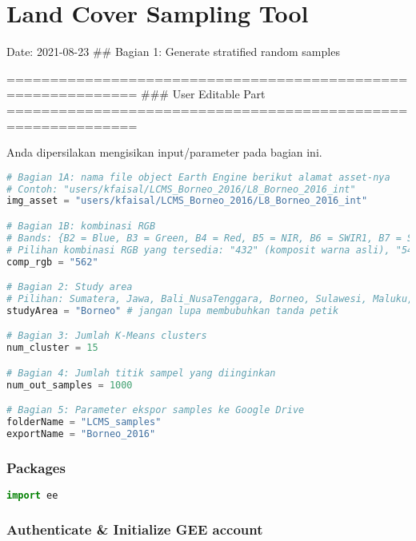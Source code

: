 \hypertarget{land-cover-sampling-tool}{%
\section{Land Cover Sampling Tool}\label{land-cover-sampling-tool}}

Date: 2021-08-23 \#\# Bagian 1: Generate stratified random samples

============================================================= \#\#\#
User Editable Part
=============================================================

Anda dipersilakan mengisikan input/parameter pada bagian ini.

\begin{lstlisting}[language=Python]
# Bagian 1A: nama file object Earth Engine berikut alamat asset-nya
# Contoh: "users/kfaisal/LCMS_Borneo_2016/L8_Borneo_2016_int" 
img_asset = "users/kfaisal/LCMS_Borneo_2016/L8_Borneo_2016_int"

# Bagian 1B: kombinasi RGB
# Bands: {B2 = Blue, B3 = Green, B4 = Red, B5 = NIR, B6 = SWIR1, B7 = SWIR2}
# Pilihan kombinasi RGB yang tersedia: "432" (komposit warna asli), "543", "562", "563", "564", "567"
comp_rgb = "562"

# Bagian 2: Study area
# Pilihan: Sumatera, Jawa, Bali_NusaTenggara, Borneo, Sulawesi, Maluku, Papua
studyArea = "Borneo" # jangan lupa membubuhkan tanda petik

# Bagian 3: Jumlah K-Means clusters
num_cluster = 15

# Bagian 4: Jumlah titik sampel yang diinginkan
num_out_samples = 1000

# Bagian 5: Parameter ekspor samples ke Google Drive
folderName = "LCMS_samples"
exportName = "Borneo_2016"
\end{lstlisting}

\hypertarget{packages}{%
\subsubsection{Packages}\label{packages}}

\begin{lstlisting}[language=Python]
import ee
\end{lstlisting}

\hypertarget{authenticate-initialize-gee-account}{%
\subsubsection{Authenticate \& Initialize GEE
account}\label{authenticate-initialize-gee-account}}

